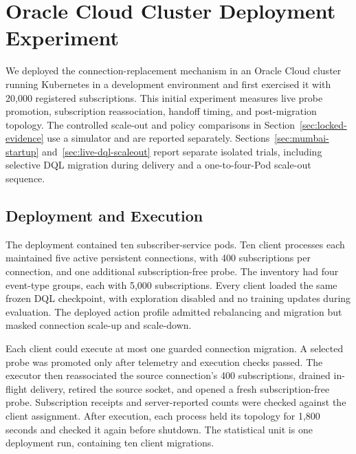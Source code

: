 \section{Oracle Cloud Cluster Deployment Experiment}
\label{sec:mumbai-experiment}

We deployed the connection-replacement mechanism in an Oracle Cloud cluster
running Kubernetes in a development environment and first exercised it with 20,000
registered subscriptions. This initial experiment
measures live probe promotion, subscription reassociation, handoff timing, and
post-migration topology. The controlled scale-out and policy comparisons in
Section~\ref{sec:locked-evidence} use a simulator and are reported separately.
Sections~\ref{sec:mumbai-startup} and~\ref{sec:live-dql-scaleout} report
separate isolated trials, including selective DQL migration during delivery
and a one-to-four-Pod scale-out sequence.

\subsection{Deployment and Execution}

The deployment contained ten subscriber-service pods. Ten client processes
each maintained five active persistent connections, with 400 subscriptions per
connection, and one additional subscription-free probe. The inventory had
four event-type groups, each with 5,000 subscriptions. Every client loaded the
same frozen DQL checkpoint, with exploration disabled and no training updates
during evaluation. The deployed action profile admitted rebalancing and
migration but masked connection scale-up and scale-down.

Each client could execute at most one guarded connection migration. A selected
probe was promoted only after telemetry and execution checks passed. The
executor then reassociated the source connection's 400 subscriptions, drained
in-flight delivery, retired the source socket, and opened a fresh
subscription-free probe. Subscription receipts and server-reported counts
were checked against the client assignment. After execution, each process
held its topology for 1,800 seconds and checked it again before shutdown.
The statistical unit is one deployment run, containing ten client migrations.


